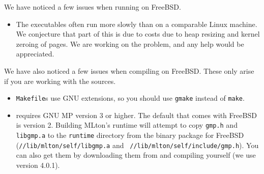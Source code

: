 
We have noticed a few issues when running {\mlton} on FreeBSD.  

\begin{itemize}

\item The executables often run more slowly than on a comparable Linux machine.
We conjecture that part of this is due to costs due to heap resizing and kernel
zeroing of pages.  We are working on the problem, and any help would be
appreciated.

\end{itemize}

We have also noticed a few issues when compiling {\mlton} on FreeBSD.  These
only arise if you are working with the {\mlton} sources.

\begin{itemize}

\item {\mlton} {\tt Makefile}s use GNU extensions, so you should use {\tt gmake}
instead of {\tt make}.

\item {\mlton} requires GNU MP version 3 or higher.  The default that comes with
FreeBSD is version 2.  Building MLton's runtime will attempt to copy
{\tt gmp.h} and {\tt libgmp.a} to the {\tt runtime} directory from the {\mlton}
binary package for FreeBSD ({\tt /\prefix/lib/mlton/self/libgmp.a} and {\tt
/\prefix/lib/mlton/self/include/gmp.h}).  You can also get them by
downloading them from  and
compiling yourself (we use version 4.0.1).
\end{itemize}
